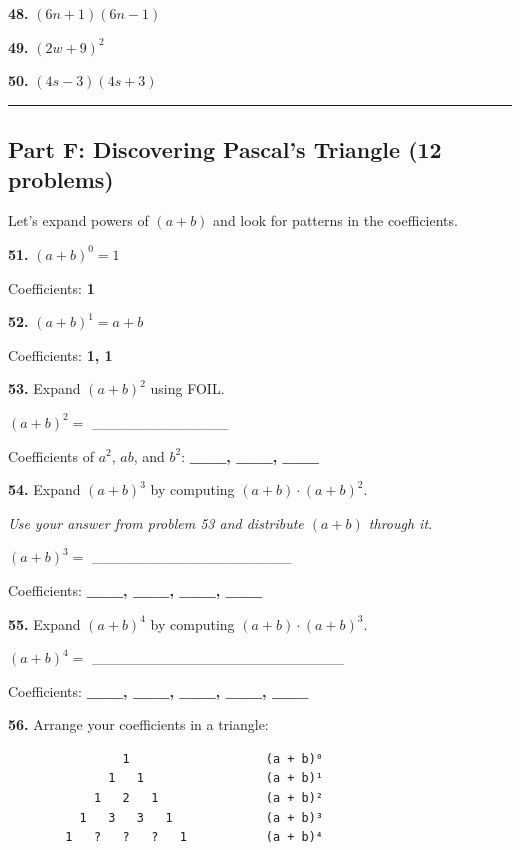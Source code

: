 \documentclass[
  11pt,
]{article}
\begin{document}
\textbf{48.} \((6n + 1)(6n - 1)\)

\textbf{49.} \((2w + 9)^2\)

\textbf{50.} \((4s - 3)(4s + 3)\)

\begin{center}\rule{0.5\linewidth}{0.5pt}\end{center}

\hypertarget{part-f-discovering-pascals-triangle-12-problems}{%
\subsection{Part F: Discovering Pascal's Triangle (12
problems)}\label{part-f-discovering-pascals-triangle-12-problems}}

Let's expand powers of \((a + b)\) and look for patterns in the
coefficients.

\textbf{51.} \((a + b)^0 = 1\)

Coefficients: \textbf{1}

\textbf{52.} \((a + b)^1 = a + b\)

Coefficients: \textbf{1, 1}

\textbf{53.} Expand \((a + b)^2\) using FOIL.

\((a + b)^2 ={}\) \_\_\_\_\_\_\_\_\_\_\_\_\_

Coefficients of \(a^2\), \(ab\), and \(b^2\): \textbf{\_\_\_, \_\_\_,
\_\_\_}

\textbf{54.} Expand \((a + b)^3\) by computing
\((a + b) \cdot (a + b)^2\).

\emph{Use your answer from problem 53 and distribute \((a + b)\) through
it.}

\((a + b)^3 ={}\) \_\_\_\_\_\_\_\_\_\_\_\_\_\_\_\_\_\_\_

Coefficients: \textbf{\_\_\_, \_\_\_, \_\_\_, \_\_\_}

\textbf{55.} Expand \((a + b)^4\) by computing
\((a + b) \cdot (a + b)^3\).

\((a + b)^4 ={}\) \_\_\_\_\_\_\_\_\_\_\_\_\_\_\_\_\_\_\_\_\_\_\_\_

Coefficients: \textbf{\_\_\_, \_\_\_, \_\_\_, \_\_\_, \_\_\_}

\textbf{56.} Arrange your coefficients in a triangle:

\begin{verbatim}
                1                   (a + b)⁰
              1   1                 (a + b)¹
            1   2   1               (a + b)²
          1   3   3   1             (a + b)³
        1   ?   ?   ?   1           (a + b)⁴
\end{verbatim}
\end{document}
